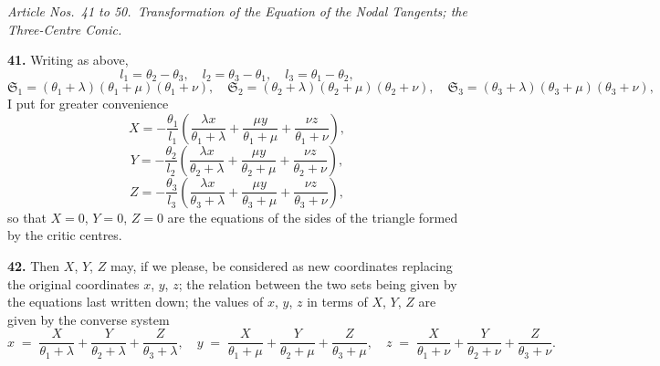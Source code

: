\documentclass[11pt,a4paper]{article}
\begin{document}
\noindent\textit{Article Nos.\ 41 to 50.\ Transformation of the Equation of the Nodal Tangents; the Three-Centre Conic.}

\medskip

\textbf{41.} Writing as above,
\[
l_{1} = \theta_{2}-\theta_{3},\quad l_{2}=\theta_{3}-\theta_{1},\quad l_{3}=\theta_{1}-\theta_{2},
\]
\[
\mathfrak{S}_{1} = (\theta_{1}+\lambda)(\theta_{1}+\mu)(\theta_{1}+\nu),\quad \mathfrak{S}_{2}=(\theta_{2}+\lambda)(\theta_{2}+\mu)(\theta_{2}+\nu),\quad \mathfrak{S}_{3}=(\theta_{3}+\lambda)(\theta_{3}+\mu)(\theta_{3}+\nu),
\]
I put for greater convenience
\[
X = -\frac{\theta_{1}}{l_{1}}\!\left(\frac{\lambda x}{\theta_{1}+\lambda} + \frac{\mu y}{\theta_{1}+\mu} + \frac{\nu z}{\theta_{1}+\nu}\right),
\]
\[
Y = -\frac{\theta_{2}}{l_{2}}\!\left(\frac{\lambda x}{\theta_{2}+\lambda} + \frac{\mu y}{\theta_{2}+\mu} + \frac{\nu z}{\theta_{2}+\nu}\right),
\]
\[
Z = -\frac{\theta_{3}}{l_{3}}\!\left(\frac{\lambda x}{\theta_{3}+\lambda} + \frac{\mu y}{\theta_{3}+\mu} + \frac{\nu z}{\theta_{3}+\nu}\right),
\]
so that $X=0$, $Y=0$, $Z=0$ are the equations of the sides of the triangle formed by the critic centres.

\medskip

\textbf{42.} Then $X$, $Y$, $Z$ may, if we please, be considered as new coordinates replacing the original coordinates $x$, $y$, $z$; the relation between the two sets being given by the equations last written down; the values of $x$, $y$, $z$ in terms of $X$, $Y$, $Z$ are given by the converse system
\[
x \;=\; \frac{X}{\theta_{1}+\lambda} + \frac{Y}{\theta_{2}+\lambda} + \frac{Z}{\theta_{3}+\lambda},
\quad
y \;=\; \frac{X}{\theta_{1}+\mu} + \frac{Y}{\theta_{2}+\mu} + \frac{Z}{\theta_{3}+\mu},
\quad
z \;=\; \frac{X}{\theta_{1}+\nu} + \frac{Y}{\theta_{2}+\nu} + \frac{Z}{\theta_{3}+\nu}.
\]

\medskip
\end{document}
